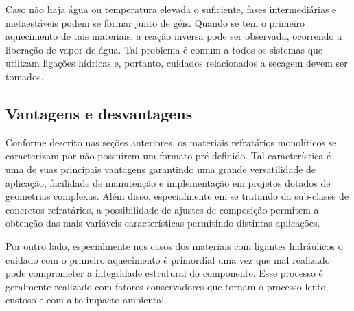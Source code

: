 
	Caso não haja água ou temperatura elevada o suficiente, fases intermediárias e
  metaestáveis podem se formar junto de géis. Quando se tem o primeiro
  aquecimento de tais materiais, a reação inversa pode ser observada, ocorrendo
  a liberação de vapor de água. Tal problema é comum a todos os sistemas que utilizam ligações hídricas e, portanto, cuidados relacionados a secagem devem ser tomados.

    \subsection{Vantagens e desvantagens}
      Conforme descrito nas seções anteriores, os materiais refratários
      monolíticos se caracterizam por não possuírem um formato pré definido. Tal
      característica é uma de suas principais vantagens garantindo uma grande
      versatilidade de aplicação, facilidade de manutenção e implementação em
      projetos dotados de geometrias complexas. Além disso, especialmente em se
      tratando da sub-classe de concretos refratários, a possibilidade de
      ajustes de composição permitem a obtenção das mais variáveis
      características permitindo distintas aplicações.

      Por outro lado, especialmente nos casos dos materiais com ligantes
      hidráulicos o cuidado com o primeiro aquecimento é primordial uma vez que
      mal realizado pode comprometer a integridade estrutural do componente.
      Esse processo é geralmente realizado com fatores conservadores que tornam
      o processo lento, custoso e com alto impacto ambiental.

 

